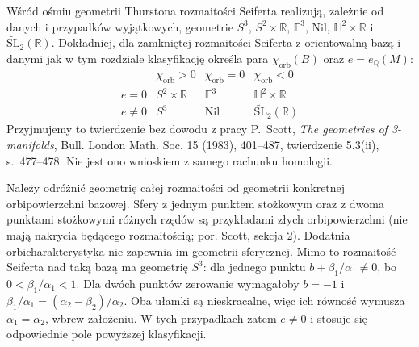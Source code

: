 \begin{uwaga}
Wśród ośmiu geometrii Thurstona rozmaitości Seiferta
realizują, zależnie od danych i przypadków wyjątkowych,
geometrie $S^3$, $S^2\times\mathbb R$, $\mathbb E^3$,
$\mathrm{Nil}$, $\mathbb H^2\times\mathbb R$
i $\widetilde{\mathrm{SL}}_2(\mathbb R)$.
Dokładniej, dla zamkniętej rozmaitości Seiferta
z orientowalną bazą i danymi jak w tym rozdziale
klasyfikację określa para $\chi_{\mathrm{orb}}(B)$
oraz $e=e_{\mathbb Q}(M)$:
\[
\begin{array}{c|ccc}
 & \chi_{\mathrm{orb}}>0 & \chi_{\mathrm{orb}}=0
 & \chi_{\mathrm{orb}}<0\\ \hline
 e=0 & S^2\times\mathbb R & \mathbb E^3
 & \mathbb H^2\times\mathbb R\\
 e\ne0 & S^3 & \mathrm{Nil}
 & \widetilde{\mathrm{SL}}_2(\mathbb R)
\end{array}
\]
Przyjmujemy to twierdzenie bez dowodu z pracy
P.~Scott, \emph{The geometries of 3-manifolds},
Bull. London Math. Soc. 15 (1983), 401--487,
twierdzenie 5.3(ii), s.~477--478.
Nie jest ono wnioskiem z samego rachunku homologii.

Należy odróżnić geometrię całej rozmaitości
od geometrii konkretnej orbipowierzchni bazowej.
Sfery z jednym punktem stożkowym oraz z dwoma
punktami stożkowymi różnych rzędów są przykładami
złych orbipowierzchni (nie mają nakrycia będącego
rozmaitością; por. Scott, sekcja 2).
Dodatnia orbicharakterystyka nie zapewnia im
geometrii sferycznej. Mimo to rozmaitość Seiferta
nad taką bazą ma geometrię $S^3$:
dla jednego punktu $b+\beta_1/\alpha_1\ne0$,
bo $0<\beta_1/\alpha_1<1$. Dla dwóch punktów
zerowanie wymagałoby $b=-1$ i
$\beta_1/\alpha_1=(\alpha_2-\beta_2)/\alpha_2$.
Oba ułamki są nieskracalne, więc ich równość
wymusza $\alpha_1=\alpha_2$, wbrew założeniu.
W tych przypadkach zatem $e\ne0$ i stosuje się
odpowiednie pole powyższej klasyfikacji.
\end{uwaga}

